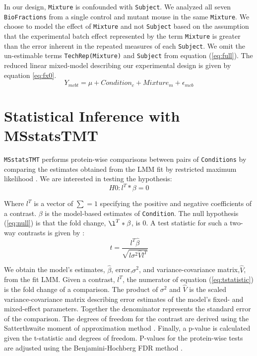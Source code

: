 \documentclass[11pt]{elife}\usepackage[]{graphicx}\usepackage[]{color}
\begin{document}
In our design, \texttt{Mixture} is confounded with \texttt{Subject}. We analyzed
all seven \texttt{BioFractions} from a single control and mutant mouse in the
same \texttt{Mixture}.  We choose to model the effect of \texttt{Mixture} and
not \texttt{Subject} based on the assumption that the experimental batch effect
represented by the term \texttt{Mixture} is greater than the error inherent in
the repeated measures of each \texttt{Subject}.  We omit the un-estimable terms
\texttt{TechRep(Mixture)} and \texttt{Subject} from equation (\ref{eq:full}).
The reduced linear mixed-model describing our experimental design is given by
equation \ref{eq:fx0}.
\begin{equation}
	\label{eq:fx0}
	Y_{mcbt} = \mu + Condition_c + Mixture_m + \epsilon_{mcb}
\end{equation}


\section{Statistical Inference with MSstatsTMT}

\texttt{MSstatsTMT} performs protein-wise comparisons between pairs of
\texttt{Conditions} by comparing the estimates obtained from the LMM fit by
restricted maximum likelihood \citep{Bates2015}. We are interested in testing
the hypothesis:
\begin{equation}
	\label{eq:null} %
	H0 : l^T * \beta = 0 
\end{equation}

Where $l^T$ is a vector of $\sum=1$ specifying the positive and negative
coefficients of a contrast. $\beta$ is the model-based estimates of
\texttt{Condition}.  The null hypothesis (\ref{eq:null}) is that the fold
change, $\l^T * \beta$, is 0.  A test statistic for such a two-way contrasts is
given by \cite{Kuznetsova2017}:
\begin{equation} 
	\label{eq:tstatistic} %
	t = \frac{l^T \hat{\beta}}{\sqrt{l \sigma^2 \hat{V} l^T}}
\end{equation}

We obtain the model's estimates, $\hat{\beta}$, error,$\sigma^2$, and
variance-covariance matrix,$\hat{V}$, from the fit LMM.  Given a contrast, $l^T$,
the numerator of equation (\ref{eq:tstatistic}) is the fold change of a
comparison.  The product of $\sigma^2$ and $\hat{V}$ is the scaled
variance-covariance matrix describing error estimates of the model's fixed- and
mixed-effect parameters.  Together the denominator represents the standard error
of the comparison. The degrees of freedom for the contrast are derived using the
Satterthwaite moment of approximation method \citep{Kuznetsova2017}.  Finally, a
p-value is calculated given the t-statistic and degrees of freedom.  P-values
for the protein-wise tests are adjusted using the Benjamini-Hochberg FDR method
\citep{Huang2020}.
\end{document}
